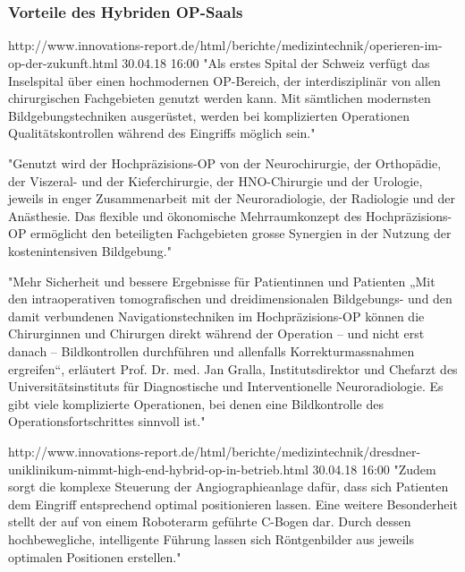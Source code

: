 \chapter{}
\label{sec:overview}

\subsection{Vorteile des Hybriden OP-Saals}
http://www.innovations-report.de/html/berichte/medizintechnik/operieren-im-op-der-zukunft.html 30.04.18 16:00
	"Als erstes Spital der Schweiz verfügt das Inselspital über einen hochmodernen OP-Bereich, der interdisziplinär von allen chirurgischen Fachgebieten genutzt werden kann. Mit sämtlichen modernsten Bildgebungstechniken ausgerüstet, werden bei komplizierten Operationen Qualitätskontrollen während des Eingriffs möglich sein."
	
	"Genutzt wird der Hochpräzisions-OP von der Neurochirurgie, der Orthopädie, der Viszeral- und der Kieferchirurgie, der HNO-Chirurgie und der Urologie, jeweils in enger Zusammenarbeit mit der Neuroradiologie, der Radiologie und der Anästhesie. Das flexible und ökonomische Mehrraumkonzept des Hochpräzisions-OP ermöglicht den beteiligten Fachgebieten grosse Synergien in der Nutzung der kostenintensiven Bildgebung."
	
	"Mehr Sicherheit und bessere Ergebnisse für Patientinnen und Patienten
	„Mit den intraoperativen tomografischen und dreidimensionalen Bildgebungs- und den damit verbundenen Navigationstechniken im Hochpräzisions-OP können die Chirurginnen und Chirurgen direkt während der Operation – und nicht erst danach – Bildkontrollen durchführen und allenfalls Korrekturmassnahmen ergreifen“, erläutert Prof. Dr. med. Jan Gralla, Institutsdirektor und Chefarzt des Universitätsinstituts für Diagnostische und Interventionelle Neuroradiologie. Es gibt viele komplizierte Operationen, bei denen eine Bildkontrolle des Operationsfortschrittes sinnvoll ist."

http://www.innovations-report.de/html/berichte/medizintechnik/dresdner-uniklinikum-nimmt-high-end-hybrid-op-in-betrieb.html 30.04.18 16:00	
	"Zudem sorgt die komplexe Steuerung der Angiographieanlage dafür, dass sich Patienten dem Eingriff entsprechend optimal positionieren lassen. Eine weitere Besonderheit stellt der auf von einem Roboterarm geführte C-Bogen dar. Durch dessen hochbewegliche, intelligente Führung lassen sich Röntgenbilder aus jeweils optimalen Positionen erstellen."
	
